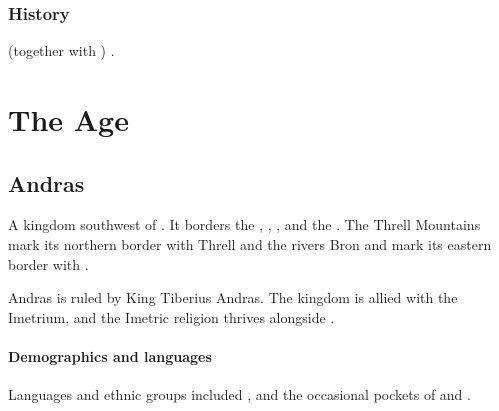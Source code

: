 \subsection{History}
\Tepharae (together with ) .







































\chapter[The Scatha Age]{The \Scatha Age}















\section{Andras}
A kingdom southwest of . 
It borders the , , ,  and the . 
The Threll Mountains mark its northern border with Threll and the rivers Bron and  mark its eastern border with \Scyrum{}. 

Andras is ruled by King Tiberius Andras. 
The kingdom is allied with the Imetrium, and the Imetric religion thrives alongside . 





\subsubsection{Demographics and languages}
Languages and ethnic groups included ,  and the occasional pockets of  and . 















